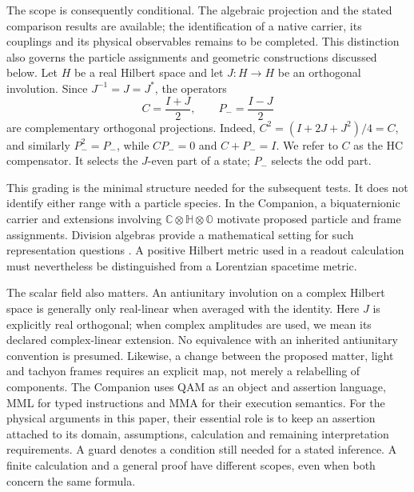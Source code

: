 The scope is consequently conditional. The algebraic projection and
the stated comparison results are available; the identification of a
native carrier, its couplings and its physical observables remains to be
completed. This distinction also governs the particle assignments and
geometric constructions discussed below.
Let $H$ be a real Hilbert space and let $J:H\to H$ be an orthogonal
involution. Since $J^{-1}=J=J^*$, the operators
\begin{equation}
 C=\frac{I+J}{2},\qquad P_-=\frac{I-J}{2}
\end{equation}
are complementary orthogonal projections. Indeed,
$C^2=(I+2J+J^2)/4=C$, and similarly $P_-^2=P_-$, while
$CP_-=0$ and $C+P_-=I$. We refer to $C$ as the HC compensator.
It selects the $J$-even part of a state; $P_-$ selects the odd part.

This grading is the minimal structure needed for the subsequent tests.
It does not identify either range with a particle species. In the
Companion, a biquaternionic carrier and extensions involving
$\mathbb C\otimes\mathbb H\otimes\mathbb O$ motivate proposed
particle and frame assignments. Division algebras provide a mathematical
setting for such representation questions \cite{Baez2002}. A positive
Hilbert metric used in a readout calculation must nevertheless be
distinguished from a Lorentzian spacetime metric.

The scalar field also matters. An antiunitary involution on a complex
Hilbert space is generally only real-linear when averaged with the
identity. Here $J$ is explicitly real orthogonal; when complex amplitudes
are used, we mean its declared complex-linear extension. No equivalence
with an inherited antiunitary convention is presumed. Likewise, a change
between the proposed matter, light and tachyon frames requires an
explicit map, not merely a relabelling of components.
The Companion uses QAM as an object and assertion language, MML for
typed instructions and MMA for their execution semantics. For the
physical arguments in this paper, their essential role is to keep an
assertion attached to its domain, assumptions, calculation and remaining
interpretation requirements. A guard denotes a condition still needed
for a stated inference. A finite calculation and a general proof have
different scopes, even when both concern the same formula.


